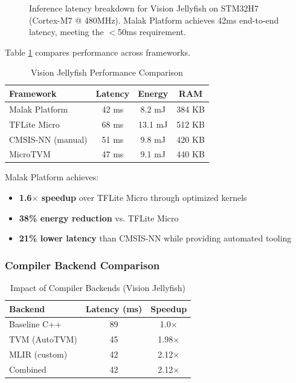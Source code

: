 \begin{figure}[h]
\centering
\resizebox{0.48\textwidth}{!}{}
\caption{Inference latency breakdown for Vision Jellyfish on STM32H7 (Cortex-M7 @ 480MHz). Malak Platform achieves 42ms end-to-end latency, meeting the $<$50ms requirement.}
\label{fig:jellyfish_latency}
\end{figure}

Table \ref{tab:jellyfish_perf} compares performance across frameworks.

\begin{table}[h]
\centering
\caption{Vision Jellyfish Performance Comparison}
\label{tab:jellyfish_perf}
\begin{tabular}{lccc}
\hline
\textbf{Framework} & \textbf{Latency} & \textbf{Energy} & \textbf{RAM} \\
\hline
Malak Platform & 42 ms & 8.2 mJ & 384 KB \\
TFLite Micro & 68 ms & 13.1 mJ & 512 KB \\
CMSIS-NN (manual) & 51 ms & 9.8 mJ & 420 KB \\
MicroTVM & 47 ms & 9.1 mJ & 440 KB \\
\hline
\end{tabular}
\end{table}

Malak Platform achieves:
\begin{itemize}
\item \textbf{1.6$\times$ speedup} over TFLite Micro through optimized kernels
\item \textbf{38\% energy reduction} vs. TFLite Micro
\item \textbf{21\% lower latency} than CMSIS-NN while providing automated tooling
\end{itemize}

\subsubsection{Compiler Backend Comparison}

\begin{table}[h]
\centering
\caption{Impact of Compiler Backends (Vision Jellyfish)}
\label{tab:compiler_vision}
\begin{tabular}{lcc}
\hline
\textbf{Backend} & \textbf{Latency (ms)} & \textbf{Speedup} \\
\hline
Baseline C++ & 89 & 1.0$\times$ \\
TVM (AutoTVM) & 45 & 1.98$\times$ \\
MLIR (custom) & 42 & 2.12$\times$ \\
Combined & 42 & 2.12$\times$ \\
\hline
\end{tabular}
\end{table}

